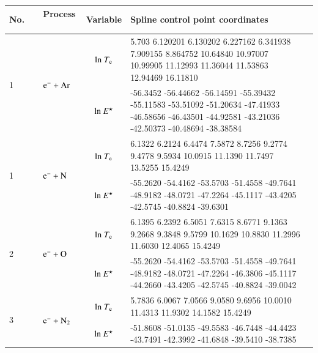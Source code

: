\begin{table}[!htbp]
  \center{}
  \begin{threeparttable}
    \label{tab:spline_tab}
    \begin{tabular*}{1.1\textwidth}{l@{\extracolsep{\fill}}lcll}
    \toprule
   No.~~ & Process ~& Variable & Spline control point coordinates  \\
        \midrule

    \multirow{2}{*}{1} &  \multirow{2}{*}{ $\rm e^- + Ar  $   } & ${\rm ln}~T_{\rm e}$  & \tiny       5.703
    6.120201
    6.130202
    6.227162
    6.341938
    7.909155
    8.864752
    10.64840
    10.97007
    10.99905
    11.12993
    11.36044
    11.53863
    12.94469
    16.11810\\
  &  & ${\rm ln}~E^\star$     & \tiny     -56.3452
    -56.44662
    -56.14591
    -55.39432
    -55.11583
    -53.51092
    -51.20634
    -47.41933
    -46.58656
    -46.43501
    -44.92581
    -43.21036
    -42.50373
    -40.48694
    -38.38584\\     
  \midrule        

  \multirow{2}{*}{1} &  \multirow{2}{*}{ $\rm e^- + N  $   } & ${\rm ln}~T_{\rm e}$  & \tiny      6.1322    6.2124    6.4474    7.5872    8.7256    9.2774    9.4778    9.5934   10.0915   11.1390   11.7497   13.5255   15.4249
 \\
  &  & ${\rm ln}~E^\star$     & \tiny -55.2620  -54.4162  -53.5703  -51.4558  -49.7641  -48.9182  -48.0721  -47.2264  -45.1117  -43.4205  -42.5745  -40.8824  -39.6301\\     
  \midrule  
      
  \multirow{2}{*}{2} &  \multirow{2}{*}{ $\rm e^- + O  $   } & ${\rm ln}~T_{\rm e}$  & \tiny    6.1395    6.2392    6.5051    7.6315    8.6771    9.1363    9.2668    9.3848    9.5799   10.1629   10.8830   11.2996   11.6030   12.4065   15.4249 \\
  &  & ${\rm ln}~E^\star$     & \tiny  -55.2620  -54.4162  -53.5703  -51.4558  -49.7641  -48.9182  -48.0721  -47.2264  -46.3806  -45.1117  -44.2660  -43.4205  -42.5745  -40.8824  -39.0042\\     
  \midrule    
  
  \multirow{2}{*}{3} &  \multirow{2}{*}{ $\rm e^- + N_2 $   } & ${\rm ln}~T_{\rm e}$  & \tiny          5.7836    6.0067    7.0566    9.0580    9.6956   10.0010   11.4313   11.9302   14.1582   15.4249
\\
  &  & ${\rm ln}~E^\star$     & \tiny       -51.8608  -51.0135  -49.5583  -46.7448  -44.4423  -43.7491  -42.3992  -41.6848  -39.5410  -38.7385
\\
  \midrule  
  

\end{tabular*}
\end{threeparttable}
\end{table}
